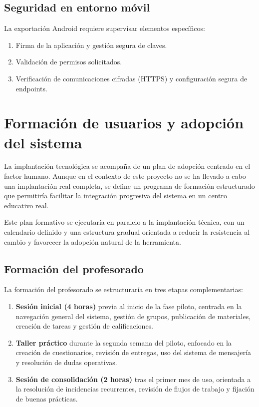 \subsection{Seguridad en entorno móvil}

La exportación Android requiere supervisar elementos específicos:

\begin{enumerate}
    \item Firma de la aplicación y gestión segura de claves.
    \item Validación de permisos solicitados.
    \item Verificación de comunicaciones cifradas (HTTPS) y configuración segura de endpoints.
\end{enumerate}


\section{Formación de usuarios y adopción del sistema}
\label{sec:formacion_implantacion}

La implantación tecnológica se acompaña de un plan de adopción centrado en el factor humano. Aunque en el contexto de este proyecto no se ha llevado a cabo una implantación real completa, se define un programa de formación estructurado que permitiría facilitar la integración progresiva del sistema en un centro educativo real.

Este plan formativo se ejecutaría en paralelo a la implantación técnica, con un calendario definido y una estructura gradual orientada a reducir la resistencia al cambio y favorecer la adopción natural de la herramienta.

\subsection{Formación del profesorado}

La formación del profesorado se estructuraría en tres etapas complementarias:

\begin{enumerate}
    \item \textbf{Sesión inicial (4 horas)} previa al inicio de la fase piloto, centrada en la navegación general del sistema, gestión de grupos, publicación de materiales, creación de tareas y gestión de calificaciones.
    \item \textbf{Taller práctico} durante la segunda semana del piloto, enfocado en la creación de cuestionarios, revisión de entregas, uso del sistema de mensajería y resolución de dudas operativas.
    \item \textbf{Sesión de consolidación (2 horas)} tras el primer mes de uso, orientada a la resolución de incidencias recurrentes, revisión de flujos de trabajo y fijación de buenas prácticas.
\end{enumerate}

